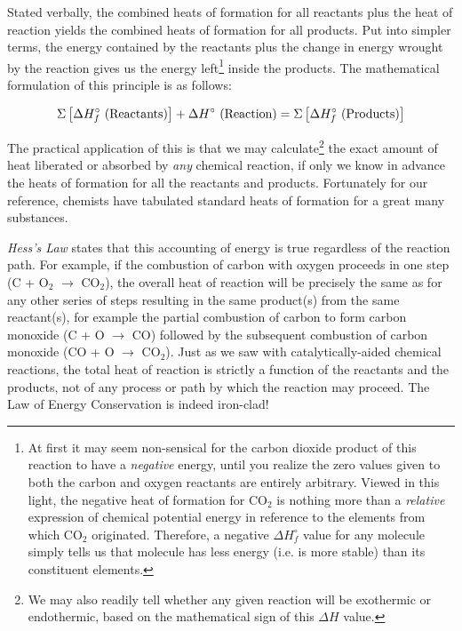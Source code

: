 Stated verbally, the combined heats of formation for all reactants plus the heat of reaction yields the combined heats of formation for all products.  Put into simpler terms, the energy contained by the reactants plus the change in energy wrought by the reaction gives us the energy left\footnote{At first it may seem non-sensical for the carbon dioxide product of this reaction to have a \textit{negative} energy, until you realize the zero values given to both the carbon and oxygen reactants are entirely arbitrary.  Viewed in this light, the negative heat of formation for CO$_{2}$ is nothing more than a \textit{relative} expression of chemical potential energy in reference to the elements from which CO$_{2}$ originated.  Therefore, a negative $\Delta H_f^{\circ}$ value for any molecule simply tells us that molecule has less energy (i.e. is more stable) than its constituent elements.} inside the products.  The mathematical formulation of this principle is as follows:

$$\Sigma \left[ \Delta H_f^{\circ} \hbox{ (Reactants)} \right] + \Delta H^{\circ} \hbox{ (Reaction)} = \Sigma \left[ \Delta H_f^{\circ} \hbox{ (Products)} \right] $$

The practical application of this is that we may calculate\footnote{We may also readily tell whether any given reaction will be exothermic or endothermic, based on the mathematical sign of this $\Delta H$ value.} the exact amount of heat liberated or absorbed by \textit{any} chemical reaction, if only we know in advance the heats of formation for all the reactants and products.  Fortunately for our reference, chemists have tabulated standard heats of formation for a great many substances.

\vskip 10pt

\textit{Hess's Law} states that this accounting of energy is true regardless of the reaction path.  For example, if the combustion of carbon with oxygen proceeds in one step (C + O$_{2}$ $\to$ CO$_{2}$), the overall heat of reaction will be precisely the same as for any other series of steps resulting in the same product(s) from the same reactant(s), for example the partial combustion of carbon to form carbon monoxide (C + O $\to$ CO) followed by the subsequent combustion of carbon monoxide (CO + O $\to$ CO$_{2}$).  Just as we saw with catalytically-aided chemical reactions, the total heat of reaction is strictly a function of the reactants and the products, not of any process or path by which the reaction may proceed.  The Law of Energy Conservation is indeed iron-clad!  

